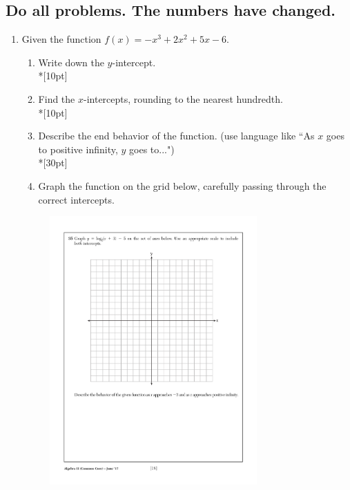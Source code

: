 \documentclass[12pt, oneside]{article}
\begin{document}
\subsection*{Do all problems. The numbers have changed.}

\vspace{1cm}

\begin{enumerate}

\item Given the function $f(x)=-x^3+2x^2+5x-6$. 
\begin{enumerate}
    \item Write down the $y$-intercept.\\*[10pt]
    \item Find the $x$-intercepts, rounding to the nearest hundredth.\\*[10pt]
    \item Describe the end behavior of the function. (use language like ``As $x$ goes to positive infinity, $y$ goes to...")\\*[30pt]
    \item Graph the function on the grid below, carefully passing through the correct intercepts. 
\end{enumerate}

\begin{figure}[!ht]
    \centering
    \includegraphics[width=0.75\textwidth]{regents-grid.pdf}
\end{figure}


\end{enumerate}
\end{document}
